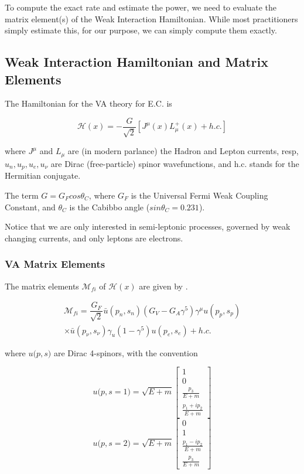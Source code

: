 \documentclass[%
 aip,
 jmp,%
 amsmath,amssymb,
 reprint,%
]{revtex4-1}
\begin{document}
To compute the exact rate and estimate the power, we need to evaluate the matrix element(s) of the Weak Interaction Hamiltonian.  
While most practitioners simply estimate this, for our purpose, we can simply compute them exactly.

\subsection{Weak Interaction Hamiltonian and Matrix Elements}

The Hamiltonian for the VA theory for E.C. is \cite{ec-review1,ec-review2,langanke,} 

$$\mathcal{H}(x)=-\dfrac{G}{\sqrt{2}}\left[J^{\mu}(x)L^{+}_{\mu}(x)+h.c.\right]$$

where $J^{\mu}$ and $L_{\mu}$ are (in modern parlance) the Hadron and Lepton currents, resp,  
$u_{n},u_{p},u_{e},u_{\nu}$ are Dirac (free-particle) spinor wavefunctions, and h.c. stands for the Hermitian conjugate.

The term $G=G_{F}cos\theta_{C}$, where  $G_{F}$ is the Universal Fermi Weak Coupling Constant, and $\theta_{C}$ is the Cabibbo angle ($sin\theta_{C}=0.231$).

Notice that we are only interested in semi-leptonic processes, governed by weak changing currents, and only leptons are electrons.  


\subsubsection{VA Matrix Elements}

The matrix elements $\mathcal{M}_{fi}$ of $\mathcal{H}(x)$ are given by \cite{zuber}.  
 
\begin{multline}
\mathcal{M}_{fi}=\dfrac{G_{F}}{\sqrt{2}}\bar{u}(p_{n},s_{n})(G_{V}-G_{A}\gamma^{5})\gamma^{\mu}u(p_{p},s_{p})\\
\times\bar{u}(p_{\nu},s_{\nu})\gamma_{u}(1-\gamma^{5})u(p_{e},s_{e}) + h.c.
\end{multline}

where $u{(p},s)$ are Dirac 4-spinors, with the convention 

$$u{(p},s=1)=\sqrt{E+m}\left[\begin{array}{c}
1\\
0\\
\frac{p_{3}}{E+m}\\
\frac{p_{1}+ip_{2}}{E+m}
\end{array}\right]$$
$$u{(p},s=2)=\sqrt{E+m}\left[\begin{array}{c}
0\\
1\\
\frac{p_{1}-ip_{2}}{E+m}\\
\frac{p_{3}}{E+m}
\end{array}\right]$$
\end{document}
